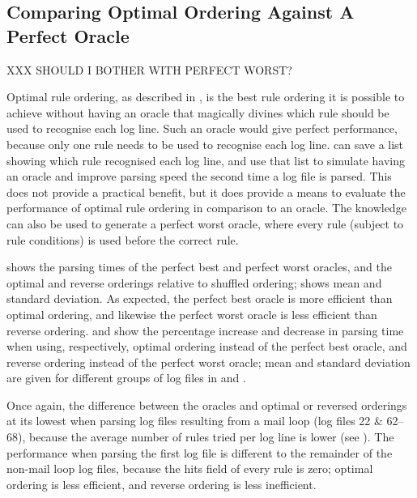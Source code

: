\subsection{Comparing Optimal Ordering Against A Perfect Oracle}

\label{perfect rule ordering}

XXX SHOULD I BOTHER WITH PERFECT WORST\@?

Optimal rule ordering, as described in , is the best rule ordering it is possible to achieve without
having an oracle that magically divines which rule should be used to
recognise each log line.  Such an oracle would give perfect performance,
because only one rule needs to be used to recognise each log line.
\parsername{} can save a list showing which rule recognised each log line,
and use that list to simulate having an oracle and improve parsing speed
the second time a log file is parsed.   This does not provide a practical
benefit, but it does provide a means to evaluate the performance of optimal
rule ordering in comparison to an oracle.  The knowledge can also be used
to generate a perfect worst oracle, where every rule (subject to rule
conditions) is used before the correct rule.

 shows the parsing times of the perfect best and perfect
worst oracles, and the optimal and reverse orderings relative to shuffled
ordering;  shows mean and standard deviation.  As expected, the perfect
best oracle is more efficient than optimal ordering, and likewise the
perfect worst oracle is less efficient than reverse ordering.
 and  show the percentage increase and decrease in parsing time when
using, respectively, optimal ordering instead of the perfect best oracle,
and reverse ordering instead of the perfect worst oracle; mean and standard
deviation are given for different groups of log files in
 and .

Once again, the difference between the oracles and optimal or reversed
orderings at its lowest when parsing log files resulting from a mail loop
(log files 22 \& 62--68), because the average number of rules tried per log
line is lower (see ).
The performance when parsing the first log file is different to the
remainder of the non-mail loop log files, because the hits field of every
rule is zero; optimal ordering is less efficient, and reverse ordering is
less inefficient.

